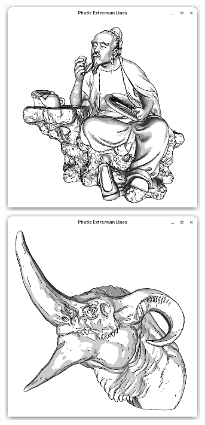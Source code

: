 \documentclass[9pt,fleqn,twoside,twocolumn]{stdglobal}
\begin{document}
\begin{figure}
\begin{subfigure}[t]{0.19\textwidth}
        \includegraphics[width=0.95\textwidth,trim={15px 15 15 50},clip]{images/results/luyu-contours-pel-toon.png}
        \includegraphics[width=0.95\textwidth,trim={15px 15 15 50},clip]{images/results/dragon-head-contours-pel-toon.png}

\end{subfigure}
\end{figure}
\end{document}
